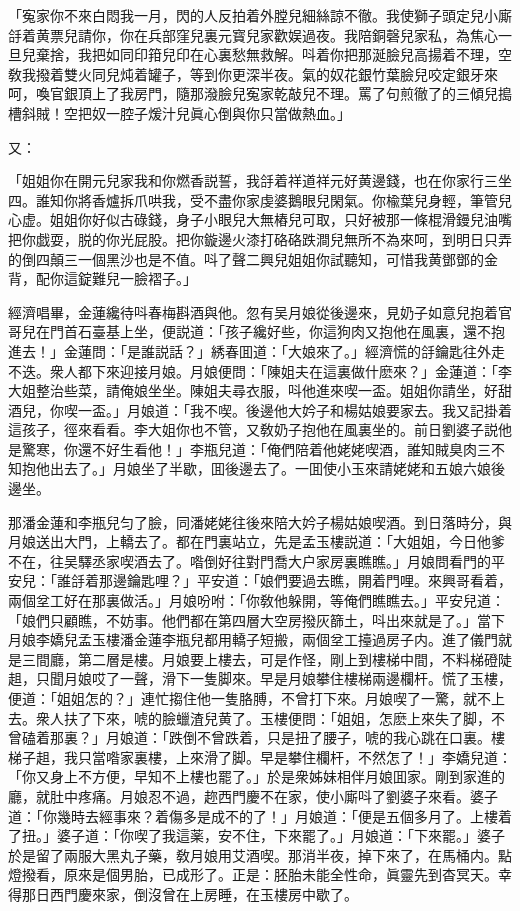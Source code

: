 \begin{myquote}
「寃家你不來白悶我一月，閃的人反拍着外膛兒細絲諒不徹。我使獅子頭定兒小廝㧱着黄票兒請你，你在兵部窪兒裏元寳兒家歡娱過夜。我陪銅磬兒家私，為焦心一旦兒棄捨，我把如同印箝兒印在心裏愁無救解。呌着你把那涎臉兒高揚着不理，空敎我撥着雙火同兒炖着罐子，等到你更深半夜。氣的奴花銀竹葉臉兒咬定銀牙來呵，喚官銀頂上了我房門，隨那潑臉兒寃家乾敲兒不理。罵了句煎徹了的三傾兒搗槽斜賊！空把奴一腔子煖汁兒眞心倒與你只當做熱血。」
\end{myquote}

又：

\begin{myquote}
「姐姐你在開元兒家我和你燃香説誓，我㧱着祥道祥元好黄邊錢，也在你家行三坐四。誰知你將香爐拆爪哄我，受不盡你家虔婆鵝眼兒閑氣。你楡葉兒身輕，筆管兒心虚。姐姐你好似古碌錢，身子小眼兒大無樁兒可取，只好被那一條棍滑鏝兒油嘴把你戯耍，脱的你光屁股。把你鏇邊火漆打硌硌跌澗兒無所不為來呵，到明日只弄的倒四顛三一個黑沙也是不值。呌了聲二興兒姐姐你試聽知，可惜我黄鄧鄧的金背，配你這錠難兒一臉褶子。」
\end{myquote}

經濟唱畢，金蓮纔待呌春梅斟酒與他。忽有吴月娘從後邊來，見奶子如意兒抱着官哥兒在門首石臺基上坐，便説道：「孩子纔好些，你這狗肉又抱他在風裏，還不抱進去！」金蓮問：「是誰説話？」綉春囬道：「大娘來了。」經濟慌的㧱鑰匙往外走不迭。衆人都下來迎接月娘。月娘便問：「陳姐夫在這裏做什麽來？」金蓮道：「李大姐整治些菜，請俺娘坐坐。陳姐夫尋衣服，呌他進來喫一盃。姐姐你請坐，好甜酒兒，你喫一盃。」月娘道：「我不喫。後邊他大妗子和楊姑娘要家去。我又記掛着這孩子，徑來看看。李大姐你也不管，又敎奶子抱他在風裏坐的。前日劉婆子説他是驚寒，你還不好生看他！」李瓶兒道：「俺們陪着他姥姥喫酒，誰知賊臭肉三不知抱他出去了。」月娘坐了半歇，囬後邊去了。一囬使小玉來請姥姥和五娘六娘後邊坐。

那潘金蓮和李瓶兒匀了臉，同潘姥姥往後來陪大妗子楊姑娘喫酒。到日落時分，與月娘送出大門，上轎去了。都在門裏站立，先是孟玉樓説道：「大姐姐，今日他爹不在，往吴驛丞家喫酒去了。喒倒好往對門喬大户家房裏瞧瞧。」月娘問看門的平安兒：「誰㧱着那邊鑰匙哩？」平安道：「娘們要過去瞧，開着門哩。來興哥看着，兩個坌工好在那裏做活。」月娘吩咐：「你敎他躲開，等俺們瞧瞧去。」平安兒道：「娘們只顧瞧，不妨事。他們都在第四層大空房撥灰篩土，呌出來就是了。」當下月娘李嬌兒孟玉樓潘金蓮李瓶兒都用轎子短搬，兩個坌工擡過房子内。進了儀門就是三間廳，第二層是樓。月娘要上樓去，可是作怪，剛上到樓梯中間，不料梯磴陡趄，只聞月娘哎了一聲，滑下一隻脚來。早是月娘攀住樓梯兩邊欄杆。慌了玉樓，便道：「姐姐怎的？」連忙搊住他一隻胳膊，不曾打下來。月娘喫了一驚，就不上去。衆人扶了下來，唬的臉蠟渣兒黄了。玉樓便問：「姐姐，怎麽上來失了脚，不曾磕着那裏？」月娘道：「跌倒不曾跌着，只是扭了腰子，唬的我心跳在口裏。樓梯子趄，我只當喒家裏樓，上來滑了脚。早是攀住欄杆，不然怎了！」李嬌兒道：「你又身上不方便，早知不上樓也罷了。」於是衆姊妹相伴月娘囬家。剛到家進的廳，就肚中疼痛。月娘忍不過，趂西門慶不在家，使小廝呌了劉婆子來看。婆子道：「你幾時去經事來？着傷多是成不的了！」月娘道：「便是五個多月了。上樓着了扭。」婆子道：「你喫了我這薬，安不住，下來罷了。」月娘道：「下來罷。」婆子於是留了兩服大黑丸子藥，敎月娘用艾酒喫。那消半夜，掉下來了，在馬桶内。點燈撥看，原來是個男胎，已成形了。正是：胚胎未能全性命，眞靈先到杳冥天。幸得那日西門慶來家，倒沒曾在上房睡，在玉樓房中歇了。

